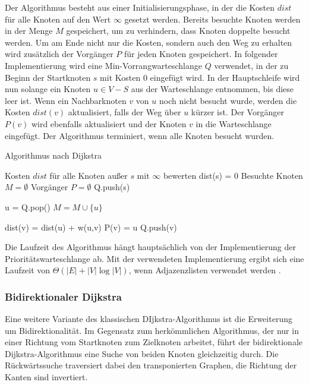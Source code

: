 Der Algorithmus besteht aus einer Initialisierungsphase, in der die Kosten $dist$ für alle Knoten
auf den Wert $\infty$ gesetzt werden. Bereits besuchte Knoten werden in der Menge $M$ gespeichert,
um zu verhindern, dass Knoten doppelte besucht werden. Um am Ende nicht nur die Kosten, sondern auch
den Weg zu erhalten wird zusätzlich der Vorgänger $P$ für jeden Knoten gespeichert. In folgender
Implementierung wird eine Min-Vorrangwarteschlange $Q$ verwendet, in der zu Beginn der Startknoten
$s$ mit Kosten 0 eingefügt wird. In der Hauptschleife wird nun solange ein Knoten $u \in V - S$ aus
der Warteschlange entnommen, bis diese leer ist. Wenn ein Nachbarknoten $v$ von $u$ noch nicht
besucht wurde, werden die Kosten $dist(v)$ aktualisiert, falls der Weg über $u$ kürzer ist. Der
Vorgänger $P(v)$ wird ebenfalls aktualisiert und der Knoten $v$ in die Warteschlange eingefügt. Der
Algorithmus  terminiert, wenn alle Knoten besucht wurden.
\begin{algorithm}[H]
    \caption{Algorithmus nach Dijkstra}
    \label{algo:dijkstra}
    \begin{algorithmic}
        \State Kosten $dist$ für alle Knoten außer $s$ mit $\infty$ bewerten
        \State dist(s) = 0
        \State Besuchte Knoten $M = \emptyset$
        \State Vorgänger $P = \emptyset$
        \State Q.push(s)

        \State u = Q.pop()
        \State $M = M \cup \{u\}$

        \State dist(v) = dist(u) + w(u,v)
        \State P(v) = u
        \State Q.push(v)
        \EndIf
        \EndFor
        \EndWhile
        \EndFunction
    \end{algorithmic}
\end{algorithm}
Die Laufzeit des Algorithmus hängt hauptsächlich von der Implementierung der Prioritätswarteschlange
ab. Mit der verwendeten Implementierung ergibt sich eine Laufzeit von $\Theta(|E| + |V| \log |V|)$,
wenn Adjazenzlisten verwendet werden \cite{intro.algo}.


\subsubsection{Bidirektionaler Dijkstra}
Eine weitere Variante des klassischen DIjkstra-Algorithmus ist die Erweiterung um Bidirektionalität.
Im Gegensatz zum herkömmlichen Algorithmus, der nur in einer Richtung vom Startknoten zum Zielknoten
arbeitet, führt der bidirektionale Dijkstra-Algorithmus eine Suche von beiden Knoten gleichzeitig
durch. Die Rückwärtssuche traversiert dabei den transponierten Graphen, \dH die Richtung der Kanten
sind invertiert.


